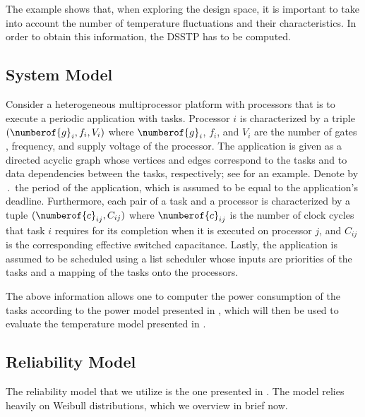 The example shows that, when exploring the design space, it is important to
take into account the number of temperature fluctuations and their
characteristics. In order to obtain this information, the \ac{DSSTP} has to be
computed.

\subsection{System Model}

Consider a heterogeneous multiprocessor platform with \np processors that is to
execute a periodic application with \nt tasks. Processor $i$ is characterized by
a triple $(\numberof{g}_i, f_i, V_i)$ where $\numberof{g}_i$, $f_i$, and $V_i$
are the number of gates \cite{liao2005}, frequency, and supply voltage of the
processor. The application is given as a directed acyclic graph whose vertices
and edges correspond to the tasks and to data dependencies between the tasks,
respectively; see  for an example. Denote by
$\period$ the period of the application, which is assumed to be equal to the
application's deadline. Furthermore, each pair of a task and a processor is
characterized by a tuple $(\numberof{c}_{ij}, C_{ij})$ where $\numberof{c}_{ij}$
is the number of clock cycles that task $i$ requires for its completion when it
is executed on processor $j$, and $C_{ij}$ is the corresponding effective
switched capacitance. Lastly, the application is assumed to be scheduled using a
list scheduler whose inputs are priorities of the tasks and a mapping of the
tasks onto the processors.

The above information allows one to computer the power consumption of the tasks
according to the power model presented in , which will then be
used to evaluate the temperature model presented in .

\subsection{Reliability Model}
\newcommand{\mean}{\mu}
\newcommand{\scale}{\eta}
\newcommand{\shape}{\beta}

The reliability model that we utilize is the one presented in \cite{huang2009b,
xiang2010}. The model relies heavily on Weibull distributions, which we overview
in brief now.

